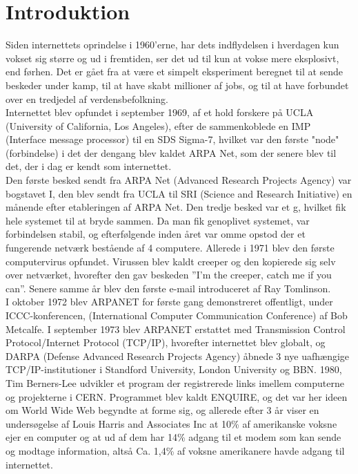 \newpage
\chapter{Introduktion}
 
    Siden internettets oprindelse i 1960’erne, har dets indflydelsen i hverdagen kun vokset sig større og ud i fremtiden, ser det ud til kun at vokse mere eksplosivt, end førhen. Det er gået fra at være et simpelt eksperiment beregnet til at sende beskeder under kamp, til at have skabt millioner af jobs, og til at have forbundet over en tredjedel af verdensbefolkning.
    \\
    Internettet blev opfundet i september 1969, af et hold forskere på UCLA (University of California, Los Angeles), efter de sammenkoblede en IMP (Interface message processor) til en SDS Sigma-7, hvilket var den første "node" (forbindelse) i det der dengang blev kaldet ARPA Net, som der senere blev til det, der i dag er kendt som internettet.\\
    Den første besked sendt fra ARPA Net (Advanced Research Projects Agency) var bogstavet I, den blev sendt fra UCLA til SRI (Science and Research Initiative) en månende efter etableringen af ARPA Net. 
    Den tredje besked var et g, hvilket fik hele systemet til at bryde sammen. Da man fik genoplivet systemet, var forbindelsen stabil, og efterfølgende inden året var omme opstod der et fungerende netværk bestående af 4 computere.
    Allerede i 1971 blev den første computervirus opfundet. Virussen blev kaldt creeper og den kopierede sig selv over netværket, hvorefter den gav beskeden ”I’m the creeper, catch me if you can”. Senere samme år blev den første e-mail introduceret af Ray Tomlinson.\\
    I oktober 1972 blev ARPANET for første gang demonstreret offentligt, under ICCC-konferencen, (International Computer Communication Conference) af Bob Metcalfe. I september 1973 blev ARPANET erstattet med Transmission Control Protocol/Internet Protocol (TCP/IP), hvorefter internettet blev globalt, og DARPA (Defense Advanced Research Projects Agency) åbnede 3 nye uafhængige TCP/IP-institutioner i Standford University, London University og BBN.
    1980, Tim Berners-Lee udvikler et program der registrerede links imellem computerne og projekterne i CERN. 
    Programmet blev kaldt ENQUIRE, og det var her ideen om World Wide Web begyndte at forme sig, og allerede efter 3 år viser en undersøgelse af Louis Harris and Associates Inc at 10\% af amerikanske voksne ejer en computer og at ud af dem har 14\% adgang til et modem som kan sende og modtage information, altså Ca. 1,4\% af voksne amerikanere havde adgang til internettet. 
